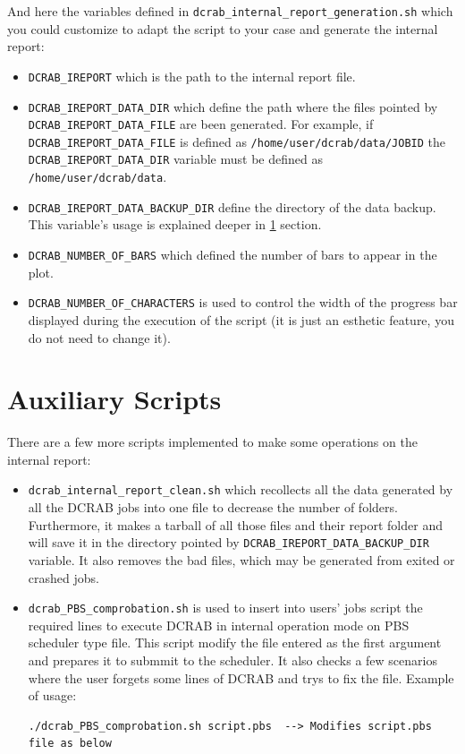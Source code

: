 \documentclass[10pt,a4paper]{report}
\begin{document}
And here the variables defined in \texttt{dcrab\_internal\_report\_generation.sh} which you could customize to adapt the script to your case and generate the internal report:

\begin{itemize}
  \item \texttt{DCRAB\_IREPORT} which is the path to the internal report file.
  \item \texttt{DCRAB\_IREPORT\_DATA\_DIR} which define the path where the files pointed by \verb+DCRAB_IREPORT_DATA_FILE+ are been generated. For example, if \verb+DCRAB_IREPORT_DATA_FILE+ is defined as \verb+/home/user/dcrab/data/JOBID+ the \verb+DCRAB_IREPORT_DATA_DIR+ variable must be defined as \verb+/home/user/dcrab/data+.
  \item \texttt{DCRAB\_IREPORT\_DATA\_BACKUP\_DIR} define the directory of the data backup. This variable's usage is explained deeper in \ref{intReportAuxScripts} section.
  \item \texttt{DCRAB\_NUMBER\_OF\_BARS} which defined the number of bars to appear in the plot.
  \item \texttt{DCRAB\_NUMBER\_OF\_CHARACTERS} is used to control the width of the progress bar displayed during the execution of the script (it is just an esthetic feature, you do not need to change it).
\end{itemize}

\section{Auxiliary Scripts}
\label{intReportAuxScripts}

There are a few more scripts implemented to make some operations on the internal report:

\begin{itemize}
  \item \texttt{dcrab\_internal\_report\_clean.sh} which recollects all the data generated by all the DCRAB jobs into one file to decrease the number of folders. Furthermore, it makes a tarball of all those files and their report folder and will save it in the directory pointed by \texttt{DCRAB\_IREPORT\_DATA\_BACKUP\_DIR} variable. It also removes the bad files, which may be generated from exited or crashed jobs.
  \item \texttt{dcrab\_PBS\_comprobation.sh} is used to insert into users' jobs script the required lines to execute DCRAB in internal operation mode on PBS scheduler type file. This script modify the file entered as the first argument and prepares it to submmit to the scheduler. It also checks a few scenarios where the user forgets some lines of DCRAB and trys to fix the file. Example of usage:

\begin{verbatim}
./dcrab_PBS_comprobation.sh script.pbs  --> Modifies script.pbs file as below
\end{verbatim}
\end{itemize}
\end{document}
